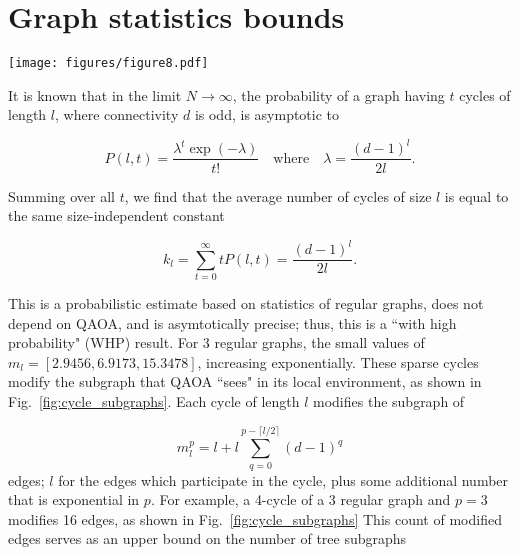 \documentclass[prb,reprint,nofootinbib,longbibliography,superscriptaddress]{revtex4-1}
\begin{document}
\section{Graph statistics bounds}
\label{sec:graph_stat_bounds}

\begin{figure*}
    \centering
    \texttt{[image: figures/figure8.pdf]}
    \caption{Counting types of subgraphs on sparse cycles to find upper and lower limits on QAOA expectation values. The presence of a finite number of cycles in an infinitely large graph slightly modifies the value of the QAOA expectation value by modifying the local subgraphs. As shown above, the edges that are modified as a part of each cycle for $p\leq 3$ are shown in black; vertices which connect to the rest of the graph are shown in red. Edge labels refer to subgraph indexing in \cite{Wurtz_guarantee.}}
    \label{fig:cycle_subgraphs}
\end{figure*}

It is known \cite{WORMALD1981168,McKay2004} that in the limit $N\to\infty$, the probability of a graph having $t$ cycles of length $l$, where connectivity $d$ is odd, is asymptotic to

\begin{equation}
    P(l,t) = \frac{\lambda^t \exp(-\lambda)}{t!}\quad\text{where}\quad \lambda = \frac{(d-1)^l}{2l}.
\end{equation}

Summing over all $t$, we  find that the average number of cycles of size $l$ is equal to the same size-independent constant

\begin{equation}
    k_l = \sum_{t=0}^\infty tP(l,t) = \frac{(d-1)^l}{2l}.
\end{equation}

This is a probabilistic estimate based on statistics of regular graphs, does not depend on QAOA, and is asymtotically precise; thus, this is  a ``with high probability" (WHP) result. For 3 regular graphs, the small values of $m_l= [ 2.9456 , 6.9173 , 15.3478 ]$, increasing exponentially. These sparse cycles modify the subgraph that QAOA ``sees" in its local environment, as shown in Fig.~\ref{fig:cycle_subgraphs}. Each cycle of length $l$ modifies the subgraph of

\begin{equation}
    m_l^p = l+l\sum_{q=0}^{p - \lceil l/2 \rceil}(d-1)^q
\end{equation}
%
edges; $l$ for the edges which participate in the cycle, plus some additional number that is exponential in $p$. For example, a 4-cycle of a 3 regular graph and $p=3$ modifies 16 edges, as shown in Fig.~\ref{fig:cycle_subgraphs} This count of modified edges serves as an upper bound on the number of tree subgraphs
\end{document}
